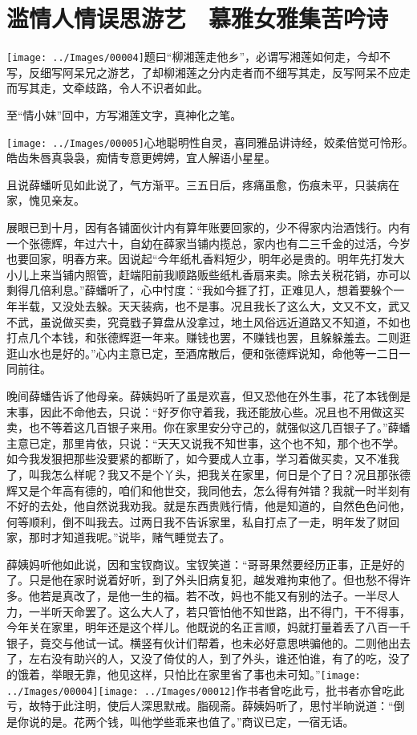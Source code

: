 

\chapter{滥情人情误思游艺　慕雅女雅集苦吟诗}\label{part0052_split_000.htmlux5cux23calibre_pb_0}

{\texttt{[image: ../Images/00004]}题曰``柳湘莲走他乡''，必谓写湘莲如何走，今却不写，反细写阿呆兄之游艺，了却柳湘莲之分内走者而不细写其走，反写阿呆不应走而写其走，文牵歧路，令人不识者如此。}

{至``情小妹''回中，方写湘莲文字，真神化之笔。}

{\texttt{[image: ../Images/00005]}心地聪明性自灵，喜同雅品讲诗经，姣柔倍觉可怜形。　皓齿朱唇真袅袅，痴情专意更娉娉，宜人解语小星星。}

且说薛蟠听见如此说了，气方渐平。三五日后，疼痛虽愈，伤痕未平，只装病在家，愧见亲友。

展眼已到十月，因有各铺面伙计内有算年账要回家的，少不得家内治酒饯行。内有一个张德辉，年过六十，自幼在薛家当铺内揽总，家内也有二三千金的过活，今岁也要回家，明春方来。因说起``今年纸札香料短少，明年必是贵的。明年先打发大小儿上来当铺内照管，赶端阳前我顺路贩些纸札香扇来卖。除去关税花销，亦可以剩得几倍利息。''薛蟠听了，心中忖度：``我如今捱了打，正难见人，想着要躲个一年半载，又没处去躲。天天装病，也不是事。况且我长了这么大，文又不文，武又不武，虽说做买卖，究竟戥子算盘从没拿过，地土风俗远近道路又不知道，不如也打点几个本钱，和张德辉逛一年来。赚钱也罢，不赚钱也罢，且躲躲羞去。二则逛逛山水也是好的。''心内主意已定，至酒席散后，便和张德辉说知，命他等一二日一同前往。

晚间薛蟠告诉了他母亲。薛姨妈听了虽是欢喜，但又恐他在外生事，花了本钱倒是末事，因此不命他去，只说：``好歹你守着我，我还能放心些。况且也不用做这买卖，也不等着这几百银子来用。你在家里安分守己的，就强似这几百银子了。''薛蟠主意已定，那里肯依，只说：``天天又说我不知世事，这个也不知，那个也不学。如今我发狠把那些没要紧的都断了，如今要成人立事，学习着做买卖，又不准我了，叫我怎么样呢？我又不是个丫头，把我关在家里，何日是个了日？况且那张德辉又是个年高有德的，咱们和他世交，我同他去，怎么得有舛错？我就一时半刻有不好的去处，他自然说我劝我。就是东西贵贱行情，他是知道的，自然色色问他，何等顺利，倒不叫我去。过两日我不告诉家里，私自打点了一走，明年发了财回家，那时才知道我呢。''说毕，赌气睡觉去了。

薛姨妈听他如此说，因和宝钗商议。宝钗笑道：``哥哥果然要经历正事，正是好的了。只是他在家时说着好听，到了外头旧病复犯，越发难拘束他了。但也愁不得许多。他若是真改了，是他一生的福。若不改，妈也不能又有别的法子。一半尽人力，一半听天命罢了。这么大人了，若只管怕他不知世路，出不得门，干不得事，今年关在家里，明年还是这个样儿。他既说的名正言顺，妈就打量着丢了八百一千银子，竟交与他试一试。横竖有伙计们帮着，也未必好意思哄骗他的。二则他出去了，左右没有助兴的人，又没了倚仗的人，到了外头，谁还怕谁，有了的吃，没了的饿着，举眼无靠，他见这样，只怕比在家里省了事也未可知。''{\texttt{[image: ../Images/00004]}\texttt{[image: ../Images/00012]}\footnotesize \kaishu 作书者曾吃此亏，批书者亦曾吃此亏，故特于此注明，使后人深思默戒。脂砚斋。}薛姨妈听了，思忖半晌说道：``倒是你说的是。花两个钱，叫他学些乖来也值了。''商议已定，一宿无话。

